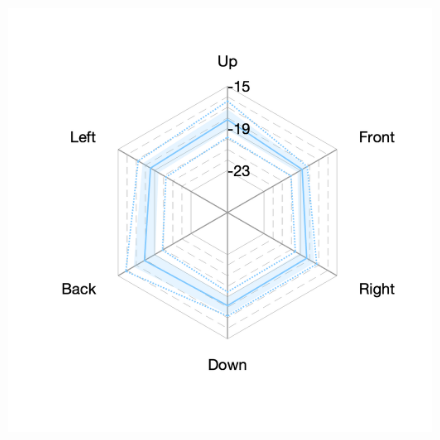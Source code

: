 \documentclass[11pt,a4j]{jreport}
\begin{document}
\begin{figure}[H]
\begin{minipage}[b]{.33\textwidth}
    \label{fig:ホールBにおけるSTlate}
  \end{minipage}%
  \begin{minipage}[b]{.33\textwidth}
    \centering
    \includegraphics[width=1\linewidth]{images/realHallDirSt/late_hall_c_allpoints.png}
    \label{fig:ホールCにおけるSTlate}
  \end{minipage}


\end{figure}
\end{document}
